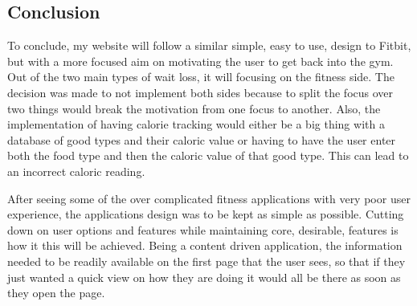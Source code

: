 \subsection{Conclusion}
To conclude, my website will follow a similar simple, easy to use, design to Fitbit, but with a more focused aim on motivating the user to get back into the gym. Out of the two main types of wait loss, it will focusing on the fitness side. The decision was made to not implement both sides because to split the focus over two things would break the motivation from one focus to another. Also, the implementation of having calorie tracking would either be a big thing with a database of good types and their caloric value or having to have the user enter both the food type and then the caloric value of that good type. This can lead to an incorrect caloric reading.

After seeing some of the over complicated fitness applications with very poor user experience, the applications design was to be kept as simple as possible. Cutting down on user options and features while maintaining core, desirable, features is how it this will be achieved. Being a content driven application, the information needed to be readily available on the first page that the user sees, so that if they just wanted a quick view on how they are doing it would all be there as soon as they open the page.
